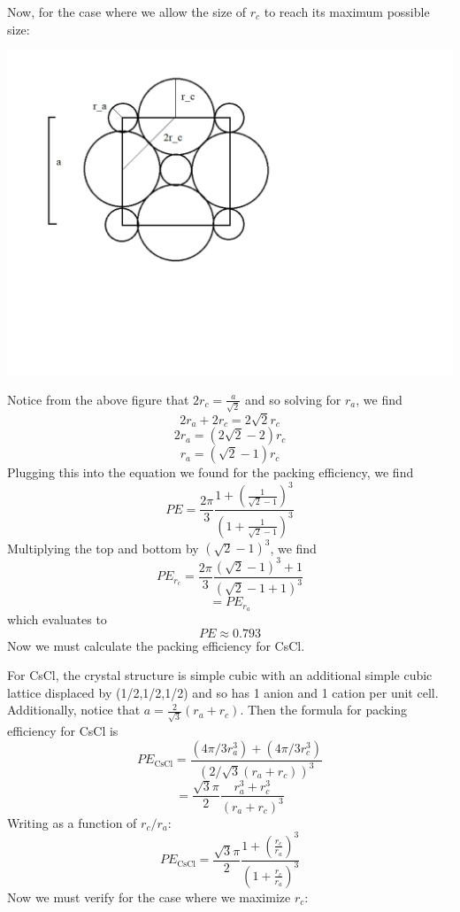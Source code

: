 \documentclass{article}
\begin{document}
Now, for the case where we allow the size of $r_c$ to reach its maximum possible size:
\begin{center}
    \includegraphics[scale = 0.4]{NaClrcLim.png}
\end{center}
Notice from the above figure that $2r_c = \frac{a}{\sqrt{2}}$ and so solving for $r_a$, we find
\[2r_a + 2r_c = 2\sqrt{2}r_c\]
\[2r_a = (2\sqrt{2} - 2)r_c\]
\[r_a = (\sqrt{2} - 1)r_c\]
Plugging this into the equation we found for the packing efficiency, we find
\[PE = \frac{2\pi}{3}\frac{1 + \left(\frac{1}{\sqrt{2} - 1}\right)^3}{\left(1 + \frac{1}{\sqrt{2}-1}\right)^3}\]
Multiplying the top and bottom by $(\sqrt{2}-1)^3$, we find
\[PE_{r_c} = \frac{2\pi}{3}\frac{(\sqrt{2}-1)^3 + 1}{(\sqrt{2} - 1 + 1)^3}\]
\[ = PE_{r_a}\]
which evaluates to 
\[PE \approx 0.793\]
Now we must calculate the packing efficiency for CsCl.
\newline


For CsCl, the crystal structure is simple cubic with an additional simple cubic lattice displaced by (1/2,1/2,1/2) and so has 1 anion and 1 cation per unit cell. Additionally, notice that $a = \frac{2}{\sqrt{3}}(r_a + r_c)$. Then the formula for packing efficiency for CsCl is
\[PE_{\text{CsCl}} = \frac{(4\pi/3r_a^3) + (4\pi/3r_c^3)}{(2/\sqrt{3}(r_a + r_c))^3}\]
\[ = \frac{\sqrt{3}\pi}{2} \frac{r_a^3 + r_c^3}{(r_a + r_c)^3}\]
Writing as a function of $r_c/r_a$:
\[PE_{\text{CsCl}} = \frac{\sqrt{3}\pi}{2} \frac{1 + \left(\frac{r_c}{r_a}\right)^3}{(1 + \frac{r_c}{r_a})^3}\]
Now we must verify for the case where we maximize $r_c$:
\end{document}
